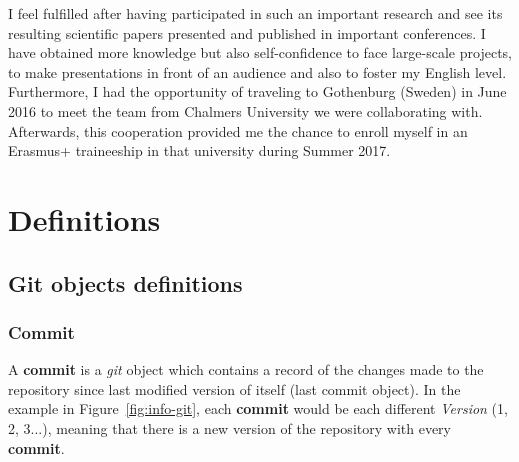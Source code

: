 \documentclass[a4paper, 12pt]{book}
\begin{document}
I feel fulfilled after having participated in such an important research and see its resulting scientific papers
presented and published in important conferences. I have obtained more knowledge but also self-confidence to face large-scale
projects, to make presentations in front of an audience and also to foster my English level. Furthermore,
I had the opportunity of traveling to Gothenburg (Sweden) in June 2016 to meet the team from Chalmers University
we were collaborating with. Afterwards, this cooperation provided me the chance to enroll myself in an
Erasmus+ traineeship in that university during Summer 2017.

\cleardoublepage



\cleardoublepage
\appendix
\chapter{Definitions}
\label{app:definitions}
\section{Git objects definitions}
\label{sec:git-definitions}
\subsection{Commit}
\label{ssec:git-commit}
A \textbf{commit} is a \emph{git} object which contains a record of the changes made to the repository since last modified
version of itself (last commit object). In the example in Figure~\ref{fig:info-git}, each \textbf{commit} would be each different
\textit{Version} (1, 2, 3...), meaning that there is a new version of the repository with every \textbf{commit}.
\end{document}
